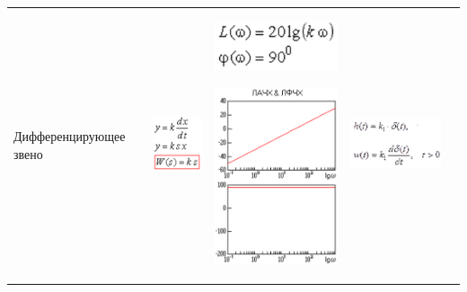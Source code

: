 \documentclass[14pt,a4paper,report]{report}
\begin{document}
\begin{table}[h!]
\begin{tabular}{ | m{3cm} | m{2.5cm} | m{4.5cm} | m{2.5cm} | m{2.5cm} }
		Дифференцирующее звено
		&
		\begin{minipage}{.3\textwidth}
			\includegraphics[scale = 0.5]{images/2_2.png}
		\end{minipage}
		&
		\begin{minipage}{.3\textwidth}
			\includegraphics[scale = 0.5]{images/2_3_f.png}
		\end{minipage}
		\begin{minipage}{.3\textwidth}
			\includegraphics[scale = 0.5]{images/2_3.png}
		\end{minipage}
		&
		\begin{minipage}{.3\textwidth}
			\includegraphics[scale = 0.4]{images/2_4.png}

\end{minipage}
\end{tabular}
\end{table}
\end{document}
